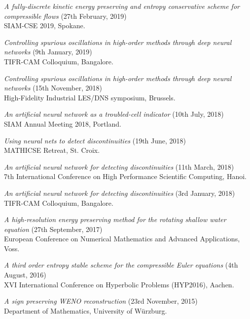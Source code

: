 \documentclass[margin]{res}
\begin{document}
\begin{resume}
              {\it A fully-discrete kinetic energy preserving and entropy conservative scheme for compressible flows} (27th February, 2019)\\
              SIAM-CSE 2019, Spokane.
              
              {\it Controlling spurious oscillations in high-order methods through deep neural networks} (9th January, 2019)\\
              TIFR-CAM Colloquium, Bangalore.
              
               {\it Controlling spurious oscillations in high-order methods through deep neural networks} (15th November, 2018)\\
              High-Fidelity Industrial LES/DNS symposium, Brussels.
             
              {\it An artificial neural network as a troubled-cell indicator} (10th July, 2018)\\
              SIAM Annual Meeting 2018, Portland.
              
               {\it Using neural nets to detect discontinuities} (19th June, 2018)\\
              MATHICSE Retreat, St. Croix.
              
              {\it An artificial neural network for detecting discontinuities} (11th March, 2018)\\
              7th International Conference on High Performance Scientific Computing, Hanoi. 
              
              {\it An artificial neural network for detecting discontinuities} (3rd January, 2018)\\
              TIFR-CAM Colloquium, Bangalore.
              
              {\it A high-resolution energy preserving method for the rotating shallow water equation} (27th September, 2017)\\
               European Conference on Numerical Mathematics and Advanced Applications, Voss.
              
              {\it A third order entropy stable scheme for the compressible Euler equations} (4th August, 2016)\\
               XVI International Conference on Hyperbolic Problems (HYP2016), Aachen. 
              
              {\it A sign preserving WENO reconstruction} (23rd November, 2015)\\
               Department of Mathematics, University of W\"{u}rzburg.
              

\end{resume}
\end{document}

